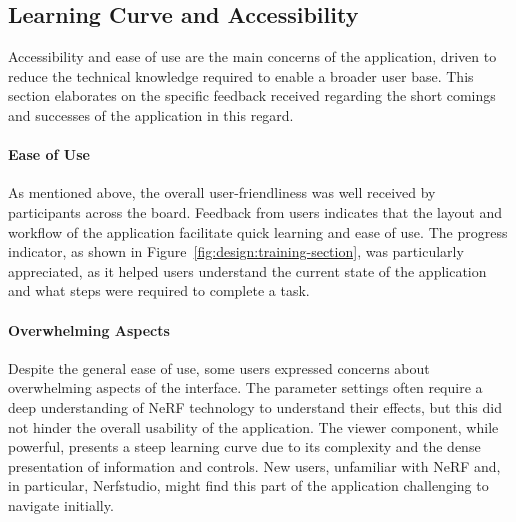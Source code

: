 \subsection*{Learning Curve and Accessibility}
\label{sec:results:learning_curve_accessibility}

Accessibility and ease of use are the main concerns of the application, driven to reduce the technical knowledge required to enable a broader user base.
This section elaborates on the specific feedback received regarding the short comings and successes of the application in this regard.

\paragraph{Ease of Use}
As mentioned above, the overall user-friendliness was well received by participants across the board.
Feedback from users indicates that the layout and workflow of the application facilitate quick learning and ease of use.
\cite{P4, P5, P7, P8, P10}
The progress indicator, as shown in Figure~\ref{fig:design:training-section}, was particularly appreciated, as it helped users understand the current state of the application and what steps were required to complete a task.
\cite{P5, P7, P8, P9}


\paragraph{Overwhelming Aspects}
Despite the general ease of use, some users expressed concerns about overwhelming aspects of the interface.
The parameter settings often require a deep understanding of NeRF technology to understand their effects, but this did not hinder the overall usability of the application.
\cite{P5, P7}
The viewer component, while powerful, presents a steep learning curve due to its complexity and the dense presentation of information and controls. 
New users, unfamiliar with NeRF and, in particular, Nerfstudio, might find this part of the application challenging to navigate initially.
\cite{P2}

